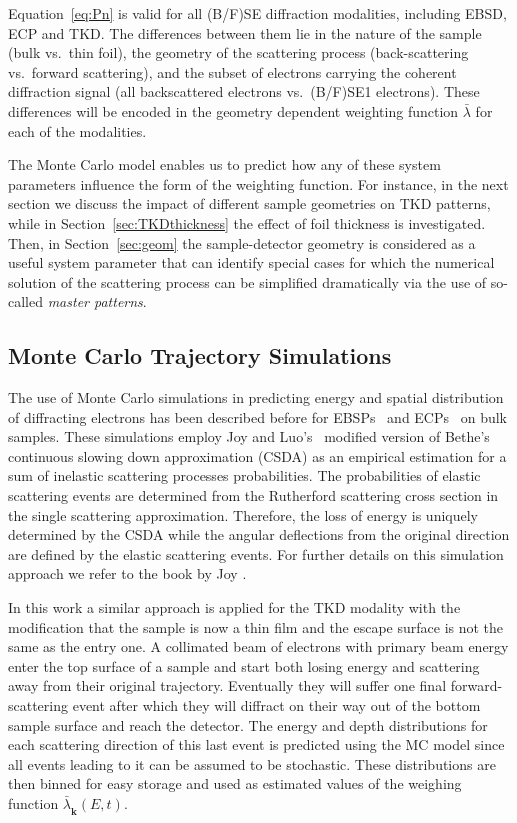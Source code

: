 Equation~\ref{eq:Pn} is valid for all (B/F)SE diffraction modalities, including EBSD, ECP and TKD. The differences between them lie in the nature of the sample (bulk vs.\ thin foil), the geometry of the scattering process (back-scattering vs.\ forward scattering), and the subset of electrons carrying the coherent diffraction signal (all backscattered electrons vs.\ (B/F)SE1 electrons). These differences will be encoded in the geometry dependent weighting function $\bar{\lambda}$ for each of the modalities. 

The Monte Carlo model enables us to predict how any of these system parameters influence the form of the weighting function. For instance, in the next section we discuss the impact of different sample geometries on TKD patterns, while in Section~\ref{sec:TKDthickness} the effect of foil thickness is investigated. Then, in Section~\ref{sec:geom} the sample-detector geometry is considered as a useful system parameter that can identify special cases for which the numerical solution of the scattering process can be simplified dramatically via the use of so-called \textit{master patterns}. 


\subsection{Monte Carlo Trajectory Simulations }
\label{sec:MC}
The use of Monte Carlo simulations in predicting energy and spatial distribution of diffracting electrons has been described before for EBSPs~\cite{degraef2013e} and ECPs~\cite{degraef2017k} on bulk samples. These simulations employ Joy and Luo's~\cite{joy1989} modified version of Bethe's continuous slowing down approximation (CSDA) as an empirical estimation for a sum of inelastic scattering processes probabilities. The probabilities of elastic scattering events are determined from the Rutherford scattering cross section in the single scattering approximation. Therefore, the loss of energy is uniquely determined by the CSDA while the angular deflections from the original direction are defined by the elastic scattering events. For further details on this simulation approach we refer to the book by Joy \cite{joy1995a}. 

In this work a similar approach is applied for the TKD modality with the modification that the sample is now a thin film and the escape surface is not the same as the entry one. A collimated beam of electrons with primary beam energy enter the top surface of a sample and start both losing energy and scattering away from their original trajectory. Eventually they will suffer one final forward-scattering event after which they will diffract on their way out of the bottom sample surface and reach the detector. The energy and depth distributions for each scattering direction of this last event is predicted using the MC model since all events leading to it can be assumed to be stochastic. These distributions are then binned for easy storage and used as estimated values of the weighing function $\bar{\lambda}_{\hat{\mathbf{k}}}(E,t)$.


